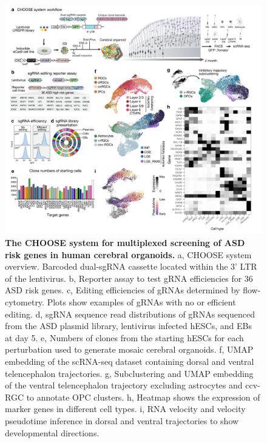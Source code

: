 \begin{figure}[t!]
    \centering
	\includegraphics[width=\textwidth]{figures/asd/Figure_1}
    \caption{\textbf{The CHOOSE system for multiplexed screening of ASD risk genes in human cerebral organoids.}
    a, CHOOSE system overview. Barcoded dual-sgRNA cassette located within the 3’ LTR of the lentivirus. b, Reporter assay to test gRNA efficiencies for 36 ASD risk genes. c, Editing efficiencies of gRNAs determined by flow-cytometry. Plots show examples of gRNAs with no or efficient editing. d, sgRNA sequence read distributions of gRNAs sequenced from the ASD plasmid library, lentivirus infected hESCs, and EBs at day 5. e, Numbers of clones from the starting hESCs for each perturbation used to generate mosaic cerebral organoids. f, UMAP embedding of the scRNA-seq dataset containing dorsal and ventral telencephalon trajectories. g, Subclustering and UMAP embedding of the ventral telencephalon trajectory excluding astrocytes and ccv-RGC to annotate OPC clusters. h, Heatmap shows the expression of marker genes in different cell types. i, RNA velocity and velocity pseudotime inference in dorsal and ventral trajectories to show developmental directions.}
    \label{fig:asd1}
\end{figure}

